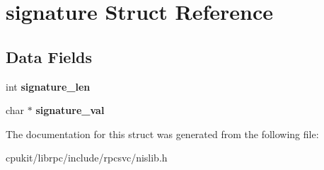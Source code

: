 \hypertarget{structsignature}{}\section{signature Struct Reference}
\label{structsignature}
\subsection*{Data Fields}
\begin{DoxyCompactItemize}
\item 
\mbox{\label{structsignature_ac8aed8c52870d35d6d0128ee4720f699}} 
int {\bfseries signature\+\_\+len}
\item 
\mbox{\label{structsignature_a5bcee1ef87bd49d23e8cf0509216da93}} 
char $\ast$ {\bfseries signature\+\_\+val}
\end{DoxyCompactItemize}


The documentation for this struct was generated from the following file\+:\begin{DoxyCompactItemize}
\item 
cpukit/librpc/include/rpcsvc/nislib.\+h\end{DoxyCompactItemize}
